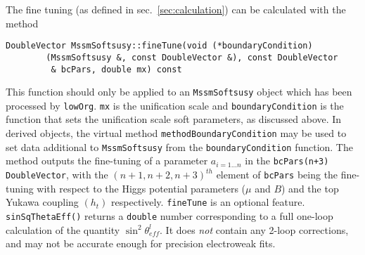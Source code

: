 \documentclass[]{article}
\def\code#1{\small{\tt #1}\normalsize}
\begin{document}
The fine tuning (as defined in sec.~\ref{sec:calculation}) can be
calculated with the method 
\small
\begin{verbatim}
DoubleVector MssmSoftsusy::fineTune(void (*boundaryCondition)
        (MssmSoftsusy &, const DoubleVector &), const DoubleVector 
         & bcPars, double mx) const 
\end{verbatim}
\normalsize
This function should only be applied to an \code{MssmSoftsusy} object which
has been processed by \code{lowOrg}. \code{mx} is the unification scale and
\code{boundaryCondition} is the function that sets the unification scale soft
parameters, as discussed above. 
In derived objects, the virtual method
\code{methodBoundaryCondition} may be used to set data additional to
\code{MssmSoftsusy} from the \code{boundaryCondition} function. 
The method outputs the fine-tuning of a
parameter $a_{i=1\ldots n}$ in the \code{bcPars(n+3)} \code{DoubleVector}, 
with the $(n+1,n+2,n+3)^{th}$ element
of \code{bcPars} being the fine-tuning with respect to the Higgs potential
parameters ($\mu$ and $B$) and
the top Yukawa coupling
$(h_t)$ respectively. \code{fineTune} is an optional feature.
\code{sinSqThetaEff()} returns a \code{double} number corresponding to a full
one-loop calculation of the quantity $\sin^2 \theta_{eff}^l$. It does {\em
  not}\/ contain any 2-loop corrections, and may not be accurate enough for
precision electroweak fits. 
\end{document}
